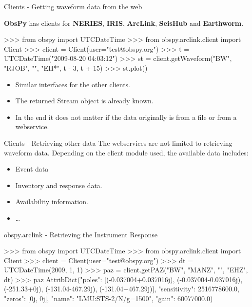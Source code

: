 \documentclass[handout]{beamer}
\begin{document}
\begin{frame}{Clients - Getting waveform data from the web}

\textbf{ObsPy} has clients for \textbf{NERIES}, \textbf{IRIS}, \textbf{ArcLink}, \textbf{SeisHub} and \textbf{Earthworm}.

\begin{myColorBox}{0.95}{}

\begin{python}
>>> from obspy import UTCDateTime
>>> from obspy.arclink.client import Client
>>> client = Client(user="test@obspy.org")
>>> t = UTCDateTime("2009-08-20 04:03:12")
>>> st = client.getWaveform("BW", "RJOB", "", "EH*",
        t - 3, t + 15)
>>> st.plot()
\end{python}

\end{myColorBox}

\begin{itemize}
    \item Similar interfaces for the other clients.
    \item The returned Stream object is already known.
    \item In the end it does not matter if the data originally is from a file or from a webservice.
\end{itemize}

\end{frame}

\begin{frame}{Clients - Retrieving other data}
    The webservices are not limited to retrieving waveform data. Depending on the client module used, the available data includes:
    \vspace{2em}
    \begin{itemize}
        \item Event data
        \item Inventory and response data.
        \item Availability information.
        \item \dots
    \end{itemize}
\end{frame}


\begin{frame}{obspy.arclink - Retrieving the Instrument Response}
\begin{myColorBox}{0.95}{}
\begin{python}
>>> from obspy import UTCDateTime
>>> from obspy.arclink.client import Client
>>> client = Client(user="test@obspy.org")
>>> dt = UTCDateTime(2009, 1, 1)
>>> paz = client.getPAZ("BW", "MANZ", "", "EHZ", dt)
>>> paz
AttribDict({"poles": [(-0.037004+0.037016j),
                (-0.037004-0.037016j), (-251.33+0j),
                (-131.04-467.29j), (-131.04+467.29j)],
            "sensitivity": 2516778600.0,
            "zeros": [0j, 0j],
            "name": "LMU:STS-2/N/g=1500",
            "gain": 60077000.0})
\end{python}
\end{myColorBox}
\end{frame}
\end{document}

